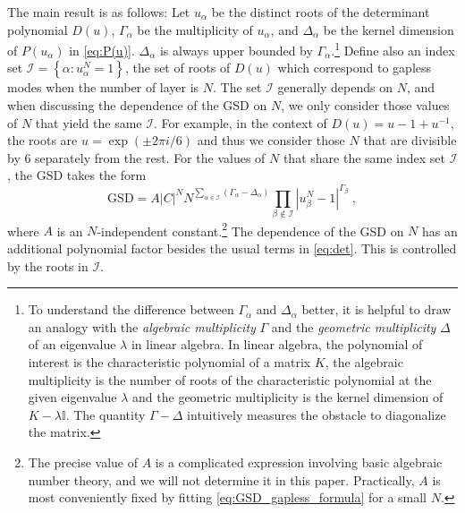 \documentclass[aps,prb,twocolumn,superscriptaddress,floatfix,10pt,nofootinbib]{revtex4-2}
\theoremstyle{definition}
\begin{document}
The main result is as follows: Let $u_\alpha$ be the {distinct} roots of the determinant polynomial $D(u)$, $\Gamma_{\alpha}$ be the multiplicity of $u_\alpha$, and  $\Delta_\alpha$ be the kernel dimension of $P(u_\alpha)$ in \eqref{eq:P(u)}. $\Delta_\alpha$ is always upper bounded by $\Gamma_\alpha$.\footnote{To understand the difference between $\Gamma_\alpha$ and $\Delta_\alpha$ better, it is helpful to draw an analogy with the \textit{algebraic multiplicity} $\Gamma$ and the \textit{geometric multiplicity} $\Delta$ of an eigenvalue $\lambda$ in linear algebra. In linear algebra, the polynomial of interest is the characteristic polynomial of a matrix $K$, the algebraic multiplicity is the number of roots of the characteristic polynomial at the given eigenvalue $\lambda$ and the geometric multiplicity is the kernel dimension of $K-\lambda \mathbb{I}$. The quantity $\Gamma-\Delta$ intuitively measures the obstacle to diagonalize the matrix. }
Define also an index set $\mathcal{I}=\left\{\alpha:u_\alpha^N=1\right\}$, the set of roots of $D(u)$ which correspond to gapless modes when the number of layer is $N$. The set $\mathcal{I}$ generally depends on $N$, and when discussing the dependence of the GSD on $N$, we only consider those values of $N$ that yield the same $\mathcal{I}$. For example, in the context of $D(u)=u-1+u^{-1}$, the roots are $u=\exp(\pm 2\pi i/6)$ and thus we consider those $N$ that are divisible by 6 separately from the rest. For the values of $N$ that share the same index set $\mathcal{I}$, the GSD takes the form
\begin{equation}\label{eq:GSD_gapless_formula}
    \text{GSD}=A|C|^N N^{\sum_{\alpha\in \mathcal{I}}(\Gamma_\alpha - \Delta_\alpha)} \prod_{\beta\notin \mathcal{I}}|u_\beta^N-1|^{\Gamma_\beta}~,
\end{equation}
where $A$ is an $N$-independent constant.\footnote{The precise value of $A$ is a complicated expression involving basic algebraic number theory, and we will not determine it in this paper. Practically, $A$ is most conveniently fixed by fitting \eqref{eq:GSD_gapless_formula} for a small $N$.} The dependence of the GSD on $N$ has an additional polynomial factor besides the usual terms in \eqref{eq:det}. This is controlled by the roots in $\mathcal{I}$. 
\end{document}
